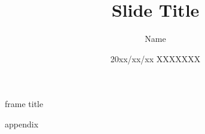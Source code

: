 \documentclass[dvipdfmx]{beamer}
\title{Slide Title}
\author{Name}
\date{20xx/xx/xx XXXXXXX}
\institute[institute]{Department}
\begin{document}
    \maketitle

    \begin{frame}{frame title}

    \end{frame}

    \appendix

    \begin{frame}{}
    \end{frame}

    \begin{frame}{appendix}

    \end{frame}
\end{document}
